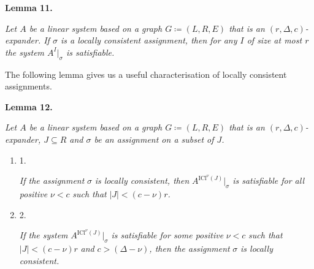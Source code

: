 

\par\medskip\noindent\textbf{
\textbf{Lemma 11}\textbf{.}
}\par



\emph{Let $A$ be a linear system based on a graph $G\coloneqq(L,R,E)$ that is an $(r,\Delta,c)$-expander. If $\sigma$ is a locally consistent assignment, then for any $I$ of size at most $r$
the system $A^{I}|_{\sigma}$ is satisfiable.}\par






The following lemma gives us a useful characterisation of locally consistent assignments.\par





\par\medskip\noindent\textbf{
\textbf{Lemma 12}\textbf{.}
}\par



\emph{Let $A$ be a linear system based on a graph $G\coloneqq(L,R,E)$ that is an $(r,\Delta,c)$-expander, $J\subseteq R$ and $\sigma$ be an assignment on a subset of $J$.}\par


\begin{enumerate}


\item[] 
1. 


\emph{If the assignment }$\sigma$\emph{ is locally consistent, then }$A^{\mathrm{ICl}^{\nu}\left(J\right)}|_{\sigma}$\emph{ is
satisfiable for all positive }$\nu<c$\emph{ such that }$|J|<(c-\nu)r$\emph{.}\par





\item[] 
2. 


\emph{If the system }$A^{\mathrm{ICl}^{\nu}\left(J\right)}|_{\sigma}$\emph{ is satisfiable for some positive }$\nu<c$\emph{
such that }$|J|<(c-\nu)r$\emph{ and }$c>(\Delta-\nu)$\emph{, then the assignment }$\sigma$\emph{ is
locally consistent.}\par





\end{enumerate}



